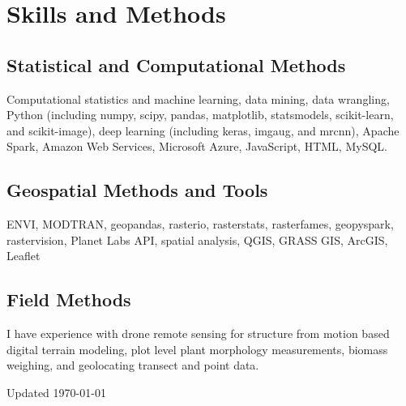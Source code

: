 \documentclass[12pt,letterpaper]{report}
\newcommand{\listitemspace}{0.15em}
\renewenvironment{itemize}
{\begin{list}{}{\setlength{\leftmargin}{0em}
			\setlength{\parskip}{0em}
			\setlength{\itemsep}{\listitemspace}
			\setlength{\parsep}{\listitemspace}}}
	{\end{list}}
\begin{document}
	
	
	\section*{Skills and Methods}
	
	\subsection*{Statistical and Computational Methods}
	
	\begin{itemize}
		
		\item Computational statistics and machine learning, data mining, data wrangling, Python (including numpy, scipy, pandas, matplotlib, statsmodels, scikit-learn, and scikit-image), deep learning (including keras, imgaug, and mrcnn), Apache Spark, Amazon Web Services, Microsoft Azure, JavaScript, HTML, MySQL.
		
	\end{itemize}
	
	\subsection*{Geospatial Methods and Tools}
	
	\begin{itemize}
		
		\item ENVI, MODTRAN, geopandas, rasterio, rasterstats, rasterfames, geopyspark, rastervision, Planet Labs API, spatial analysis, QGIS, GRASS GIS, ArcGIS, Leaflet
		
	\end{itemize}
	
	\subsection*{Field Methods}
	
	\begin{itemize}
		
		\item I have experience with drone remote sensing for structure from motion based digital terrain modeling, plot level plant morphology measurements, biomass weighing, and geolocating transect and point data.
		
	\end{itemize}
	
	
	
	\begin{center}
		\vspace{6em}
		Updated \monthyeardate\today
	\end{center}
	
	
	
\end{document}
